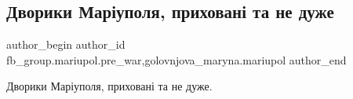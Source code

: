  
 
 
 
 

\subsection{Дворики Маріуполя, приховані та не дуже}
\label{sec:11_02_2023.fb.fb_group.mariupol.pre_war.10.dvoriki_mar_upolya__}
 
\ifcmt
 author_begin
   author_id fb_group.mariupol.pre_war,golovnjova_maryna.mariupol
 author_end
\fi

Дворики Маріуполя, приховані та не дуже.
